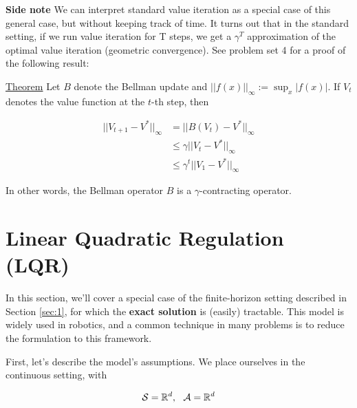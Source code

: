 \documentclass{article}
\begin{document}
\textbf{Side note} We can interpret standard value iteration as a special case of this general case, but without keeping track of time. It turns out that in the standard setting, if we run value iteration for T steps, we get a $ \gamma^T $ approximation of the optimal value iteration (geometric convergence). See problem set 4 for a proof of the following result:



\vspace{0.5cm}

\underline{Theorem} Let $ B $ denote the Bellman update and $ || f(x) ||_{\infty}  := \sup_{x} |f(x)|$. If $ V_t $ denotes the value function at the $ t $-th step, then

\begin{align*}
	|| V_{t+1} - V^* ||_{\infty} &= || B(V_t) - V^* ||_{\infty}\\
	&\leq \gamma || V_t - V^* ||_\infty\\
	&\leq \gamma^{t} || V_1 - V^* ||_\infty
\end{align*}

In other words, the Bellman operator $ B $ is a $ \gamma $-contracting operator.

\section{Linear Quadratic Regulation (LQR)}

In this section, we'll cover a special case of the finite-horizon setting described in Section \ref{sec:1}, for which the \textbf{exact solution} is (easily) tractable. This model is widely used in robotics, and a common technique in many problems is to reduce the formulation to this framework.

First, let's describe the model's assumptions. We place ourselves in the continuous setting, with

\[ \mathcal{S} = \mathbb{R}^\di, \ \ \mathcal{A} = \mathbb{R}^\di \]
\end{document}
